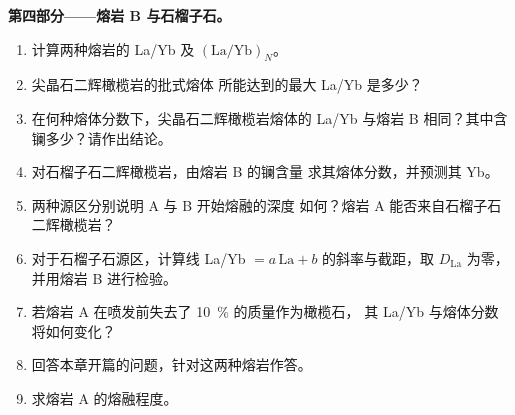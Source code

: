 \begin{problem}
\medskip\noindent\textbf{第四部分——熔岩 B 与石榴子石。}
\begin{enumerate}[resume]
\item 计算两种熔岩的 La/Yb 及 $(\mathrm{La}/\mathrm{Yb})_N$。
\item 尖晶石二辉橄榄岩的批式熔体
所能达到的最大 La/Yb 是多少？
\item 在何种熔体分数下，尖晶石二辉橄榄岩熔体的
La/Yb 与熔岩 B 相同？其中含镧多少？请作出结论。
\item 对石榴子石二辉橄榄岩，由熔岩 B 的镧含量
求其熔体分数，并预测其 Yb。
\item 两种源区分别说明 A 与 B 开始熔融的深度
如何？熔岩 A 能否来自石榴子石二辉橄榄岩？
\item 对于石榴子石源区，计算线 La/Yb $= a\,
\mathrm{La} + b$ 的斜率与截距，取 $D_{\mathrm{La}}$ 为零，
并用熔岩 B 进行检验。
\item 若熔岩 A 在喷发前失去了 \qty{10}{\percent} 的质量作为橄榄石，
其 La/Yb 与熔体分数将如何变化？
\item 回答本章开篇的问题，针对这两种熔岩作答。
\item 求熔岩 A 的熔融程度。
\end{enumerate}
\end{problem}
